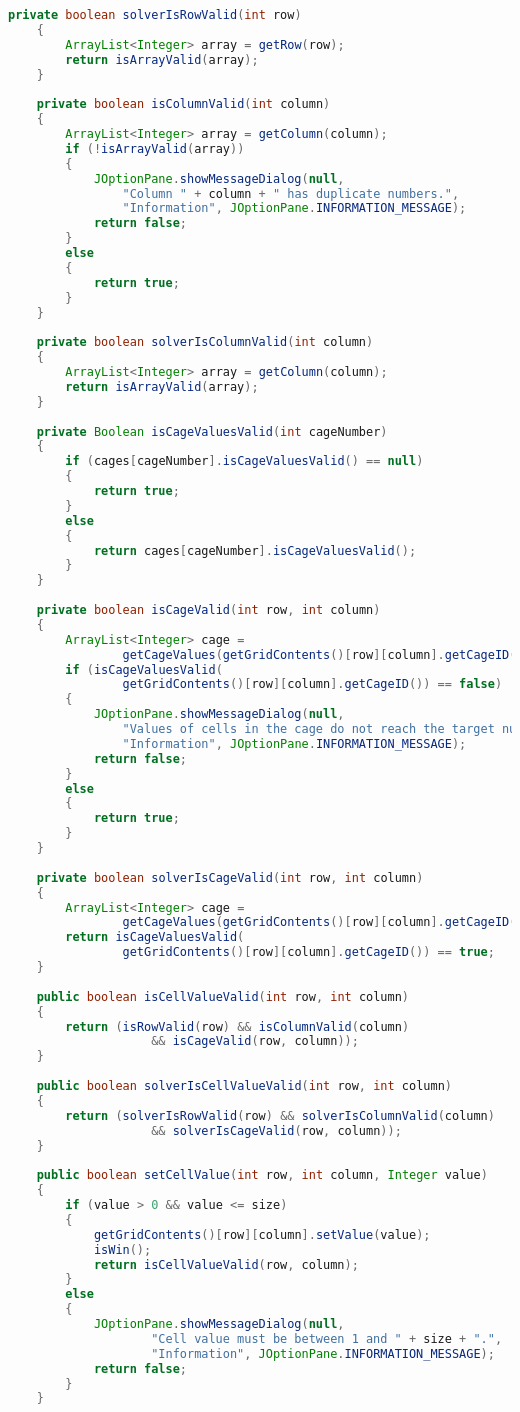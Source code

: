\begin{lstlisting}[language=Java,basicstyle=\tiny,caption=Grid.java]
    private boolean solverIsRowValid(int row)
    {
        ArrayList<Integer> array = getRow(row);
        return isArrayValid(array);
    }
    
    private boolean isColumnValid(int column)
    {
        ArrayList<Integer> array = getColumn(column);
        if (!isArrayValid(array))
        {
            JOptionPane.showMessageDialog(null, 
                "Column " + column + " has duplicate numbers.",
                "Information", JOptionPane.INFORMATION_MESSAGE);
            return false;
        }
        else
        {
            return true;
        }
    }
    
    private boolean solverIsColumnValid(int column)
    {
        ArrayList<Integer> array = getColumn(column);
        return isArrayValid(array);
    }
    
    private Boolean isCageValuesValid(int cageNumber)
    {
        if (cages[cageNumber].isCageValuesValid() == null)
        {
            return true;
        }
        else
        {
            return cages[cageNumber].isCageValuesValid();
        }
    }
    
    private boolean isCageValid(int row, int column)
    {
        ArrayList<Integer> cage = 
                getCageValues(getGridContents()[row][column].getCageID());
        if (isCageValuesValid(
                getGridContents()[row][column].getCageID()) == false)
        {
            JOptionPane.showMessageDialog(null, 
                "Values of cells in the cage do not reach the target number.",
                "Information", JOptionPane.INFORMATION_MESSAGE);
            return false;
        }
        else
        {
            return true;
        }
    }
    
    private boolean solverIsCageValid(int row, int column)
    {
        ArrayList<Integer> cage = 
                getCageValues(getGridContents()[row][column].getCageID());
        return isCageValuesValid(
                getGridContents()[row][column].getCageID()) == true;
    }
    
    public boolean isCellValueValid(int row, int column)
    {
        return (isRowValid(row) && isColumnValid(column) 
                    && isCageValid(row, column));
    }
    
    public boolean solverIsCellValueValid(int row, int column)
    {
        return (solverIsRowValid(row) && solverIsColumnValid(column) 
                    && solverIsCageValid(row, column));
    }
    
    public boolean setCellValue(int row, int column, Integer value)
    {
        if (value > 0 && value <= size)
        {
            getGridContents()[row][column].setValue(value);
            isWin();
            return isCellValueValid(row, column);
        }
        else
        {
            JOptionPane.showMessageDialog(null, 
                    "Cell value must be between 1 and " + size + ".",
                    "Information", JOptionPane.INFORMATION_MESSAGE);
            return false;
        }   
    }
    

\end{lstlisting}
